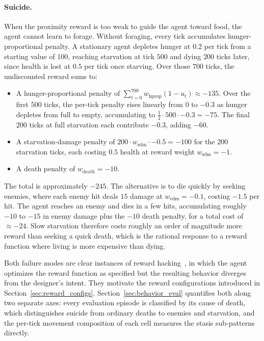 \documentclass[12pt,a4paper,titlepage]{article}
\begin{document}
\paragraph{Suicide.} When the proximity reward is too weak to guide the agent toward food, the agent cannot learn to forage. Without foraging, every tick accumulates hunger-proportional penalty. A stationary agent depletes hunger at $0.2$ per tick from a starting value of $100$, reaching starvation at tick $500$ and dying $200$ ticks later, since health is lost at $0.5$ per tick once starving. Over those $700$ ticks, the undiscounted reward sums to:
\begin{itemize}[nosep,leftmargin=1.6em]
  \item A hunger-proportional penalty of $\sum_{t=0}^{700} w_\text{hprop} (1 - u_t) \approx -135$. Over the first $500$ ticks, the per-tick penalty rises linearly from $0$ to $-0.3$ as hunger depletes from full to empty, accumulating to $\tfrac{1}{2} \cdot 500 \cdot -0.3 = -75$. The final $200$ ticks at full starvation each contribute $-0.3$, adding $-60$.
  \item A starvation-damage penalty of $200 \cdot w_\text{sdm} \cdot -0.5 = -100$ for the $200$ starvation ticks, each costing $0.5$ health at reward weight $w_\text{sdm} = -1$.
  \item A death penalty of $w_\text{death} = -10$.
\end{itemize}
The total is approximately $-245$. The alternative is to die quickly by seeking enemies, where each enemy hit deals $15$ damage at $w_\text{edm} = -0.1$, costing $-1.5$ per hit. The agent reaches an enemy and dies in a few hits, accumulating roughly $-10$ to $-15$ in enemy damage plus the $-10$ death penalty, for a total cost of $\approx -24$. Slow starvation therefore costs roughly an order of magnitude more reward than seeking a quick death, which is the rational response to a reward function where living is more expensive than dying.

Both failure modes are clear instances of reward hacking~\citep{Amodei2016, Leike2017}, in which the agent optimizes the reward function as specified but the resulting behavior diverges from the designer's intent. They motivate the reward configurations introduced in Section~\ref{sec:reward_configs}. Section~\ref{sec:behavior_eval} quantifies both along two separate axes: every evaluation episode is classified by its cause of death, which distinguishes suicide from ordinary deaths to enemies and starvation, and the per-tick movement composition of each cell measures the stasis sub-patterns directly.
\end{document}
